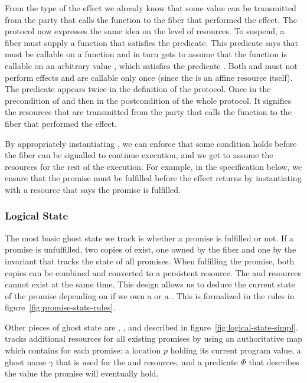 From the type of the \esuspend{} effect we already know that some value can be transmitted from the party that calls the  function to the fiber that performed the effect.
The \esuspend{} protocol now expresses the same idea on the level of resources.
To suspend, a fiber must supply a function  that satisfies the \gsIsReg{} predicate.
This predicate says that  must be callable on a  function and in turn gets to assume that the  function is callable on an arbitrary value , which satisfies the predicate .
Both  and  must not perform effects and are callable only once (since the \ewpt{} is an affine resource itself).
The predicate  appears twice in the definition of the protocol.
Once in the precondition of  and then in the postcondition of the whole protocol.
It signifies the resources that are transmitted from the party that calls the  function to the fiber that performed the effect.

By appropriately instantiating , we can enforce that some condition holds before the fiber can be signalled to continue execution, and we get to assume the resources  for the rest of the execution.
For example, in the  specification below, we ensure that the promise must be fulfilled before the effect returns by instantiating  with a resource that says the promise is fulfilled.

\subsubsection{Logical State}
\label{sec:sched-spec-state}

The most basic ghost state we track is whether a promise is fulfilled or not.
If a promise  is unfulfilled, two copies of \gspwait{} exist, one owned by the fiber and one by the invariant that tracks the state of all promises.
When fulfilling the promise, both copies can be combined and converted to a persistent \gspdone{} resource.
The \gspwait{} and \gspdone{} resources cannot exist at the same time.
This design allows us to deduce the current state of the promise depending on if we own a \gspwait{} or a \gspdone{}.
This is formalized in the rules in figure~\ref{fig:promise-state-rules}.

Other pieces of ghost state are \gsPInvIn{}, \gsIsPr{}, and \gsReady{} described in figure~\ref{fig:logical-state-simpl}.
\gsPInvIn{} tracks additional resources for all existing promises by using an authoritative map which contains for each promise:
a location \(p\) holding its current program value, a ghost name \(\gamma\) that is used for the \gspwait{} and \gspdone{} resources, and a predicate \(Φ\) that describes the value the promise will eventually hold.

